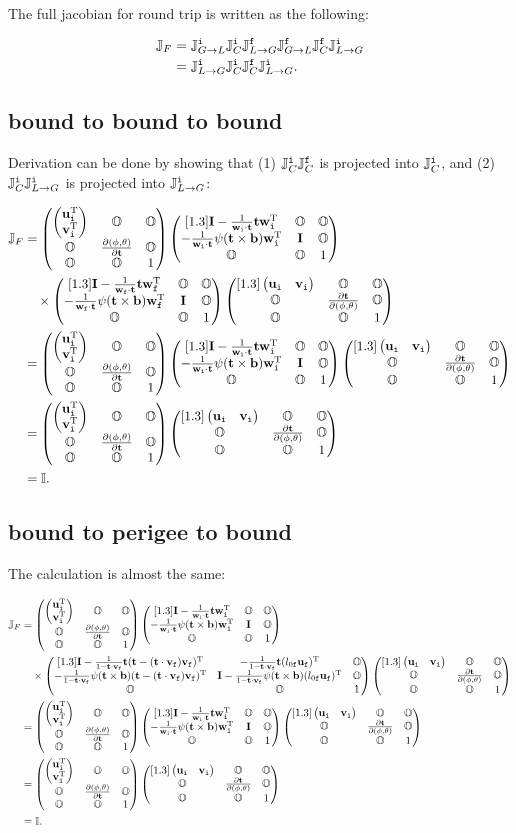 \documentclass[12pt,a4paper]{scrarticle}
\begin{document}
The full jacobian for round trip is written as the following:

\begin{align}
    \jacobianFull & = \jacobianGlobalToLocalInitial \jacobianCorrectionInitial \jacobianLocalToGlobalFinal \jacobianGlobalToLocalFinal \jacobianCorrectionFinal \jacobianLocalToGlobalInitial \\
    & = \jacobianLocalToGlobalInitial \jacobianCorrectionInitial \jacobianCorrectionFinal \jacobianLocalToGlobalInitial.
\end{align}

\subsection{bound to bound to bound}

Derivation can be done by showing that (1) $\jacobianCorrectionInitial \jacobianCorrectionFinal$ is projected into $\jacobianCorrectionInitial$, and (2) $\jacobianCorrectionInitial \jacobianLocalToGlobalInitial$ is projected into $\jacobianLocalToGlobalInitial$:

\begin{align*}
    \jacobianFull & = \jacobianGlobalToLocalInitialExpansion \jacobianCorrectionInitialExpansion \\
    & \quad \times \jacobianCorrectionFinalExpansion \jacobianLocalToGlobalInitialExpansion \\
    & = \jacobianGlobalToLocalInitialExpansion \jacobianCorrectionInitialExpansion \jacobianLocalToGlobalInitialExpansion \\
    & = \jacobianGlobalToLocalInitialExpansion \jacobianLocalToGlobalInitialExpansion \\ 
    & = \IdentityMatrixFive.
\end{align*}


\subsection{bound to perigee to bound}

The calculation is almost the same:

\begin{align*}
    \jacobianFull & = \jacobianGlobalToLocalInitialExpansion \jacobianCorrectionInitialExpansion \\
    & \quad \times \jacobianCorrectionFinalExpansionPerigee \jacobianLocalToGlobalInitialExpansion \\    
    & = \jacobianGlobalToLocalInitialExpansion \jacobianCorrectionInitialExpansion \jacobianLocalToGlobalInitialExpansion \\
    & = \jacobianGlobalToLocalInitialExpansion \jacobianLocalToGlobalInitialExpansion \\ 
    & = \IdentityMatrixFive.
\end{align*}
\end{document}
